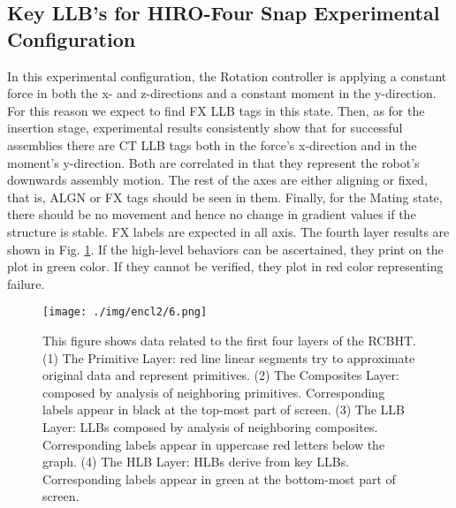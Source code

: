 \subsection{Key LLB's for HIRO-Four Snap Experimental Configuration}
In this experimental configuration, the Rotation controller is applying a constant force in both the x- and z-directions and a constant moment in the y-direction. For this reason we expect to find FX LLB tags in this state. Then, as for the insertion stage, experimental results consistently show that for successful assemblies there are CT LLB tags both in the force's x-direction and in the moment's y-direction. Both are correlated in that they represent the robot's downwards assembly motion. The rest of the axes are either aligning or fixed, that is, ALGN or FX tags should be seen in them. Finally, for the Mating state, there should be no movement and hence no change in gradient values if the structure is stable. FX labels are expected in all axis.
The fourth layer results are shown in Fig. \ref{fig:hlBehs}. If the high-level behaviors can be ascertained, they print on the plot in green color. If they cannot be verified, they plot in red color representing failure.
\begin{figure}[h]
    \centering
    \texttt{[image: ./img/encl2/6.png]}
    \caption{This figure shows data related to the first four layers of the RCBHT. (1) The Primitive Layer: red line linear segments try to approximate original data and represent primitives. (2) The Composites Layer: composed by analysis of neighboring primitives. Corresponding labels appear in black at the top-most part of screen. (3) The LLB Layer: LLBs composed by analysis of neighboring composites. Corresponding labels appear in uppercase red letters below the graph. (4) The HLB Layer: HLBs derive from key LLBs. Corresponding labels appear in green at the bottom-most part of screen.}
    \label{fig:hlBehs}
\end{figure}
